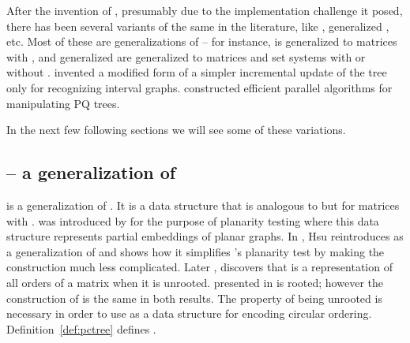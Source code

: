 After the invention of \PQtrees, presumably due to the implementation
challenge it posed, there has been several variants of the same in the
literature, like \PCtree
\cite{sh99,wlh01,hm03}, generalized \PQtree \cite{km89,mcc04}, \PQRtree
\cite{mm96,mpt98} etc. Most of these are generalizations of \PQtree --
for instance, \PCtree is generalized to matrices with \CROP, \PQRtree and
generalized \PQtree are generalized to matrices and set systems with
or without \COP. \cite{km89} invented a modified form of \PQtree a simpler
incremental update of the tree only for recognizing interval graphs.
\cite{kr88} constructed efficient parallel algorithms for manipulating
PQ trees.   

In the next few following sections we will see some of these
variations.

    
\subsection{\PCtree -- a generalization of \PQtree}

\PCtree is a generalization of \PQtree. It is a data structure that is
analogous to \PQtree but for matrices with \crop. \PCtree was
introduced by \cite{sh99} for the purpose of planarity testing where
this data structure represents partial embeddings of planar
graphs. %
In \cite{wlh01}, Hsu reintroduces \PCtree as a generalization of
\PQtree and shows how it simplifies \cite{bl76}'s planarity test by
making the \PQtree construction much less complicated. Later
\cite{hm03}, discovers that \PCtree is a representation of all \crop
orders of a matrix when it is unrooted. \PCtree presented in
\cite{wlh01} is rooted; however the construction of \PCtree is the
same in both results. The property of being unrooted is necessary in
order to use \PCtree as a data structure for encoding circular
ordering. Definition~\ref{def:pctree} defines \PCtree.


